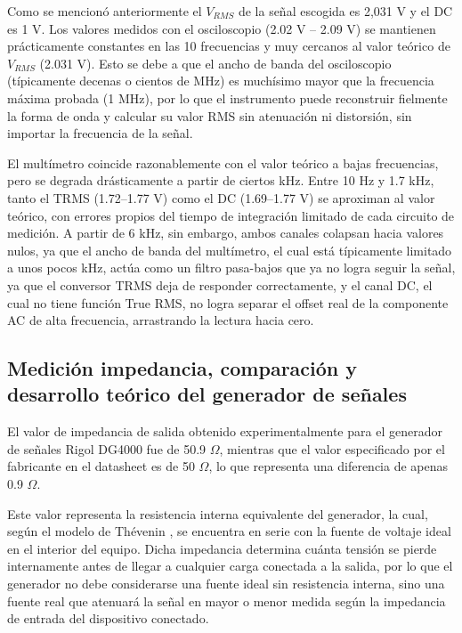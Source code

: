 \documentclass[journal, a4paper]{IEEEtran}
\begin{document}
Como se mencionó anteriormente el $V_{RMS}$ de la señal escogida es 2,031 V y el DC es 1 V. Los valores medidos con el osciloscopio (2.02 V -- 2.09 V) se mantienen prácticamente constantes en las 10 frecuencias y muy cercanos al valor teórico de $V_{RMS}$ (2.031 V). Esto se debe a que el ancho de banda del osciloscopio (típicamente decenas o cientos de MHz) es muchísimo mayor que la frecuencia máxima probada (1 MHz), por lo que el instrumento puede reconstruir fielmente la forma de onda y calcular su valor RMS sin atenuación ni distorsión, sin importar la frecuencia de la señal.

El multímetro coincide razonablemente con el valor teórico a bajas frecuencias, pero se degrada drásticamente a partir de ciertos kHz. Entre 10 Hz y 1.7 kHz, tanto el TRMS (1.72--1.77 V) como el DC (1.69--1.77 V) se aproximan al valor teórico, con errores propios del tiempo de integración limitado de cada circuito de medición. A partir de 6 kHz, sin embargo, ambos canales colapsan hacia valores nulos, ya que el ancho de banda del multímetro, el cual está típicamente limitado a unos pocos kHz, actúa como un filtro pasa-bajos que ya no logra seguir la señal, ya que el conversor TRMS deja de responder correctamente, y el canal DC, el cual no tiene función True RMS, no logra separar el offset real de la componente AC de alta frecuencia, arrastrando la lectura hacia cero.

\subsection{Medición impedancia, comparación y desarrollo teórico del generador de señales}

El valor de impedancia de salida obtenido experimentalmente para el generador de señales Rigol DG4000 fue de 50.9 $\Omega$, mientras que el valor especificado por el fabricante en el datasheet es de 50 $\Omega$, lo que representa una diferencia de apenas 0.9 $\Omega$.

Este valor representa la resistencia interna equivalente del generador, la cual, según el modelo de Thévenin \cite{sedra2020}, se encuentra en serie con la fuente de voltaje ideal en el interior del equipo. Dicha impedancia determina cuánta tensión se pierde internamente antes de llegar a cualquier carga conectada a la salida, por lo que el generador no debe considerarse una fuente ideal sin resistencia interna, sino una fuente real que atenuará la señal en mayor o menor medida según la impedancia de entrada del dispositivo conectado.
\end{document}
